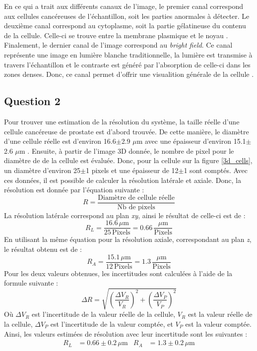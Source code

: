 \documentclass[11pt,letterpaper]{article}
\begin{document}
En ce qui a trait aux différents canaux de l'image, le premier canal correspond aux cellules cancéreuses de l'échantillon, soit les parties anormales à détecter. Le deuxième canal correspond au cytoplasme, soit la partie gélatineuse du contenu de la cellule. Celle-ci se trouve entre la membrane plasmique et le noyau \cite{futura_definition_2024}. Finalement, le dernier canal de l'image correspond au \textit{bright field}. Ce canal représente une image en lumière blanche traditionnelle, la lumière est transmise à travers l'échantillon et le contraste est généré par l'absorption de celle-ci dans les zones denses. Donc, ce canal permet d'offrir une visualition générale de la cellule \cite{sciencedirect_bright_nodate}.

\subsection{Question 2}
Pour trouver une estimation de la résolution du système, la taille réelle d'une cellule cancéreuse de prostate est d'abord trouvée. De cette manière, le diamètre d'une cellule réelle est d'environ 16.6$\pm$2.9 $\mu$m avec une épaisseur d'environ 15.1$\pm$2.6 $\mu$m \cite{seo_mechanical_2017}. Ensuite, à partir de l'image 3D donnée, le nombre de pixel pour le diamètre de de la cellule est évaluée. Donc, pour la cellule sur la figure \ref{3d_cells}, un diamètre d'environ 25$\pm$1 pixels et une épaisseur de 12$\pm$1 sont comptés. Avec ces données, il est possible de calculer la résolution latérale et axiale. Donc, la résolution est donnée par l'équation suivante :
\begin{equation}
  R=\frac{\text{Diamètre de cellule réelle}}{\text{Nb de pixels}}
\end{equation}
La résolution latérale correspond au plan \textit{xy}, ainsi le résultat de celle-ci est de :
\begin{equation}
  R_{L}=\frac{16.6\,\mu\mathrm{m}}{25\,\mathrm{Pixels}}=0.66\,\frac{\mu\mathrm{m}}{\mathrm{Pixels}}
\end{equation}
En utilisant la même équation pour la résolution axiale, correspondant au plan \textit{z}, le résultat obtenu est de :
\begin{equation}
  R_{A}=\frac{15.1\,\mu\mathrm{m}}{12\,\mathrm{Pixels}}=1.3\,\frac{\mu\mathrm{m}}{\mathrm{Pixels}}
\end{equation}
Pour les deux valeurs obtenues, les incertitudes sont calculées à l'aide de la formule suivante :
\begin{equation}
  \Delta R=\sqrt{\left(\frac{\Delta V_{R}}{V_{R}}\right)^{2}+\left(\frac{\Delta V_{P}}{V_{P}}\right)^{2}}
\end{equation}
Où $\Delta V_{R}$ est l'incertitude de la valeur réelle de la cellule, $V_{R}$ est la valeur réelle de la cellule, $\Delta V_{P}$ est l'incertitude de la valeur comptée, et $V_{P}$ est la valeur comptée. Ainsi, les valeurs estimées de résolution avec leur incertitude sont les suivantes :
\begin{align*}
  R_{L}&=0.66\pm0.2\,\mu\mathrm{m} & R_{A}&=1.3\pm0.2\,\mu\mathrm{m} \\
\end{align*}
\end{document}

